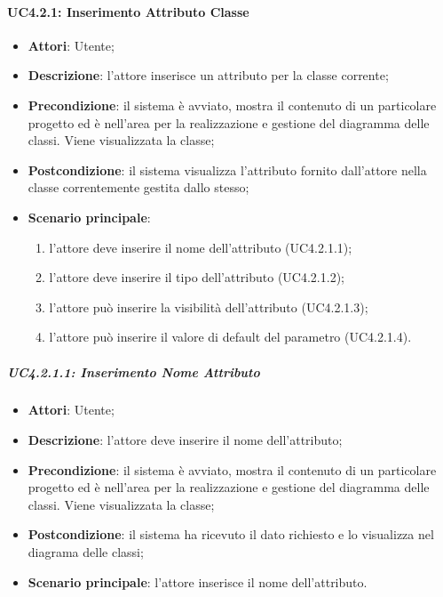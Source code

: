 \paragraph{UC4.2.1: Inserimento Attributo Classe}
\label{UC4.2.1}
\begin{itemize}
	\item \textbf{Attori}: Utente;
	\item \textbf{Descrizione}: l'attore inserisce un attributo per la classe corrente;
	\item \textbf{Precondizione}:  il sistema è avviato, mostra il contenuto di un particolare progetto ed è nell'area per la realizzazione e gestione del diagramma delle classi. Viene visualizzata la classe;
	\item \textbf{Postcondizione}: il sistema visualizza l'attributo fornito dall'attore nella classe correntemente gestita dallo stesso;
	\item \textbf{Scenario principale}:
	\begin{enumerate}
		\item l'attore deve inserire il nome dell'attributo (UC4.2.1.1);
		\item l'attore deve inserire il tipo dell'attributo (UC4.2.1.2);
		\item l'attore può inserire la visibilità dell'attributo (UC4.2.1.3);
		\item l'attore può inserire il valore di default del parametro (UC4.2.1.4).
	\end{enumerate}
\end{itemize}

\subparagraph{UC4.2.1.1: Inserimento Nome Attributo}
\label{UC4.2.1.1}
\begin{itemize}
	\item \textbf{Attori}: Utente;
	\item \textbf{Descrizione}: l'attore deve inserire il nome dell'attributo;
	\item \textbf{Precondizione}: il sistema è avviato, mostra il contenuto di un particolare progetto ed è nell'area per la realizzazione e gestione del diagramma delle classi. Viene visualizzata la classe;
	\item \textbf{Postcondizione}: il sistema ha ricevuto il dato richiesto e lo visualizza nel diagrama delle classi;
	\item \textbf{Scenario principale}: l'attore inserisce il nome dell'attributo.
\end{itemize}

